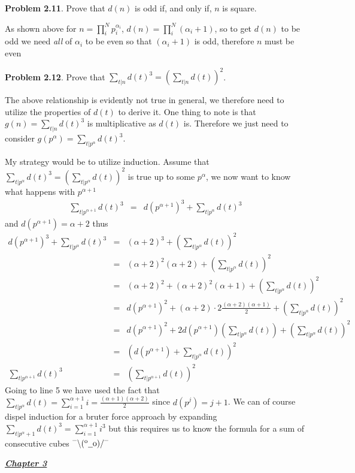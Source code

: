 \documentclass[aps,preprint,preprintnumbers,nofootinbib,showpacs,prd]{revtex4-1}
\newcommand{\nbea}{\begin{eqnarray*}}
\newcommand{\neea}{\end{eqnarray*}}
\newcommand{\dunno}{$ {}^{\mbox {--}}\backslash(^{\rm o}{}\underline{\hspace{0.2cm}}{\rm o})/^{\mbox {--}}$}
\begin{document}
{\bf Problem 2.11}. Prove that $d(n)$ is odd if, and only if, $n$ is square.

As shown above for $n = \prod_i^N p_i^{\alpha_i}$, $d(n) = \prod_i^N (\alpha_i + 1)$, so to get $d(n)$ to be odd we need {\it all} of $\alpha_i$ to be even so that $(\alpha_i + 1)$ is odd, therefore $n$ must be even

{\bf Problem 2.12}. Prove that $\sum_{t|n} d(t)^3 = \left (\sum_{t|n} d(t)\right )^2$.

The above relationship is evidently not true in general, we therefore need to utilize the properties of $d(t)$ to derive it. One thing to note is that $g(n) = \sum_{t|n} d(t)^3$ is multiplicative as $d(t)$ is. Therefore we just need to consider $g(p^\alpha) = \sum_{t|p^\alpha} d(t)^3$.

My strategy would be to utilize induction. Assume that $\sum_{t|p^\alpha} d(t)^3 = \left (\sum_{t|p^\alpha} d(t)\right )^2$ is true up to some $p^\alpha$, we now want to know what happens with $p^{\alpha+1}$
%
\nbea
\sum_{t|p^{\alpha+1}} d(t)^3 & = & d(p^{\alpha+1})^3 + \sum_{t|p^\alpha} d(t)^3
\neea
%
and $d(p^{\alpha+1}) = \alpha+2$ thus
%
\nbea
d(p^{\alpha+1})^3 + \sum_{t|p^\alpha} d(t)^3 & = & (\alpha + 2)^3 + \left ( \sum_{t|p^\alpha} d(t)\right )^2 \\
& = & (\alpha + 2)^2(\alpha + 2) + \left ( \sum_{t|p^\alpha} d(t)\right )^2 \\
& = & (\alpha + 2)^2 + (\alpha + 2)^2(\alpha + 1) + \left ( \sum_{t|p^\alpha} d(t)\right )^2 \\
& = & d(p^{\alpha + 1})^2 + (\alpha + 2)\cdot 2 \frac{(\alpha + 2)(\alpha + 1)}{2} + \left ( \sum_{t|p^\alpha} d(t)\right )^2 \\
& = & d(p^{\alpha + 1})^2 + 2 d(p^{\alpha+1})\left (\sum_{t|p^\alpha} d(t) \right ) + \left ( \sum_{t|p^\alpha} d(t)\right )^2 \\
& = & \left ( d(p^{\alpha + 1}) + \sum_{t|p^\alpha} d(t) \right )^2 \\
\sum_{t|p^{\alpha+1}} d(t)^3 & = & \left ( \sum_{t|p^{\alpha+1}} d(t) \right )^2
\neea
%
Going to line 5 we have used the fact that $\sum_{t|p^\alpha} d(t) = \sum_{i=1}^{\alpha+1} i = \frac{(\alpha+1)(\alpha + 2)}{2} $ since $d(p^j) = j+1$. We can of course dispel induction for a bruter force approach by expanding $\sum_{t|p^\alpha+1} d(t)^3 = \sum_{i=1}^{\alpha+1} i^3$ but this requires us to know the formula for a sum of consecutive cubes \dunno

\bigskip
\underline{\textbf{\textit{Chapter 3}}}
\smallskip
\end{document}
